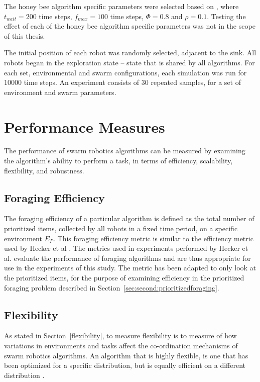 The honey bee algorithm specific parameters were selected based on \cite{seeley2009wisdom}, where
 $t_{wait}=200$ time steps, $f_{max}=100$ time steps, $\Phi=0.8$ and $\rho=0.1$. Testing the effect of each of the honey bee algorithm specific parameters was not in the scope of this thesis.

The initial position of each robot was randomly selected, adjacent to the sink. All robots began in the exploration state -- state that is shared by all algorithms. For each set, environmental and swarm configurations, each simulation was run for 10000 time steps. An experiment consists of 30 repeated samples, for a set of environment and swarm parameters.

\section{Performance Measures}
\label{thri:third:performancemeasures}

The performance of swarm robotics algorithms can be measured by examining the algorithm's ability to perform a task, in terms of efficiency, scalability, flexibility, and robustness.

\subsection{Foraging Efficiency}
\label{setup:foragingefficiency}
The foraging efficiency of a particular algorithm is defined as the total number of prioritized items, collected by all robots in a fixed time period, on a specific environment $E_P$. This foraging efficiency metric is similar to the efficiency metric used by Hecker et al \cite{hecker2015beyond}. The metrics used in experiments performed by Hecker et al. evaluate the performance of foraging algorithms and are thus appropriate for use in the experiments of this study. The metric has been adapted to only look at the prioritized items, for the purpose of examining efficiency in the prioritized foraging problem described in Section~\ref{sec:second:prioritizedforaging}.

\subsection{Flexibility}
\label{setup:flexibility}
As stated in Section~\ref{flexibility}, to measure flexibility is to measure of how variations in environments and tasks affect the co-ordination mechanisms of swarm robotics algorithms. An algorithm that is highly flexible, is one that has been optimized for a specific distribution, but is equally efficient on a different distribution \cite{hecker2015beyond}.

